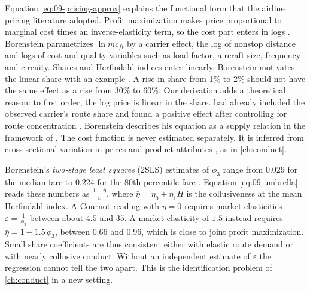 Equation \eqref{eq:09-pricing-approx} explains the functional form that the airline pricing literature
adopted. Profit maximization makes price proportional to marginal cost times an inverse-elasticity term,
so the cost part enters in logs \citep[p.~354]{Borenstein1989}. Borenstein parametrizes $\ln mc_{ft}$
by a carrier effect, the log of nonstop distance and logs of cost and quality variables such as load
factor, aircraft size, frequency and circuity. Shares and Herfindahl indices enter linearly. Borenstein
motivates the linear share with an example \citep[p.~354]{Borenstein1989}. A rise in share from 1\% to 2\%
should not have the same effect as a rise from 30\% to 60\%. Our derivation adds a theoretical reason: to
first order, the log price is linear in the share. \citet{BaileyGrahamKaplan1985} had already included the observed carrier's route share and found a
positive effect after controlling for route concentration \citep[p.~348, n.~18]{Borenstein1989}.
Borenstein describes his equation as a supply relation in the framework of \citet{Bresnahan1989}. The cost function is never estimated separately. It is
inferred from cross-sectional variation in prices and product attributes \citep[p.~348, n.~18]{Borenstein1989},
as in \cref{ch:conduct}.

\begin{remark}\label{rem:09-share-coef}
Borenstein's \emph{two-stage least squares} (2SLS) estimates of $\phi_3$ range from $0.029$ for the median fare to
$0.224$ for the 80th percentile fare \citep[Table~2]{Borenstein1989}. Equation
\eqref{eq:09-umbrella} reads these numbers as $\frac{1-\bar\eta}{\varepsilon}$, where
$\bar\eta=\eta_0+\eta_1\bar H$ is the collusiveness at the mean Herfindahl index. A Cournot reading
with $\bar\eta=0$ requires market elasticities $\varepsilon=\frac{1}{\phi_3}$ between about $4.5$ and
$35$. A market elasticity of $1.5$ instead requires $\bar\eta=1-1.5\,\phi_3$, between $0.66$ and $0.96$,
which is close to joint profit maximization. Small share coefficients are thus consistent either with
elastic route demand or with nearly collusive conduct. Without an independent estimate of $\varepsilon$
the regression cannot tell the two apart. This is the identification problem of \cref{ch:conduct} in a
new setting.
\end{remark}

